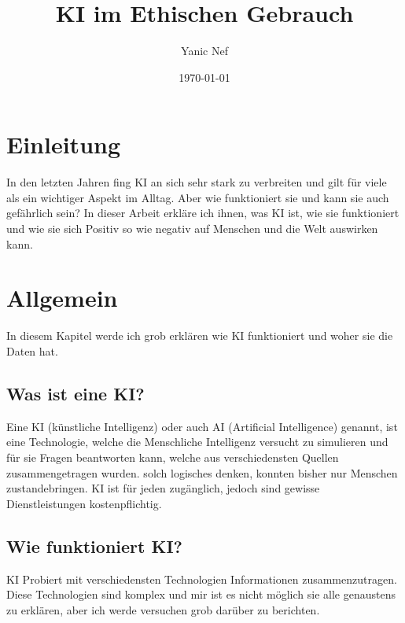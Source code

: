 \documentclass{report}
\title{KI im Ethischen Gebrauch}
\author{Yanic Nef}
\date{\today}
\begin{document}
\maketitle


\tableofcontents

\chapter{Einleitung}

In den letzten Jahren fing KI an sich sehr stark zu verbreiten und gilt für viele als ein wichtiger Aspekt im Alltag. Aber wie funktioniert sie und kann sie auch gefährlich sein? In dieser Arbeit erkläre ich ihnen, was KI ist, wie sie funktioniert und wie sie sich Positiv so wie negativ auf Menschen und die Welt auswirken kann.


\chapter{Allgemein}
\label{chap:allgemein}

In diesem Kapitel werde ich grob erklären wie KI funktioniert und woher sie die Daten hat.

\section{Was ist eine KI?}

Eine KI (künstliche Intelligenz) oder auch AI (Artificial Intelligence) genannt, ist eine Technologie, welche die Menschliche Intelligenz versucht zu simulieren und für sie Fragen beantworten kann, welche aus verschiedensten Quellen zusammengetragen wurden. solch logisches denken, konnten bisher nur Menschen zustandebringen. KI ist für jeden zugänglich, jedoch sind gewisse Dienstleistungen kostenpflichtig.

\section{Wie funktioniert KI?}

KI Probiert mit verschiedensten Technologien Informationen zusammenzutragen. Diese Technologien sind komplex und mir ist es nicht möglich sie alle genaustens zu erklären, aber ich werde versuchen grob darüber zu berichten.
\end{document}
